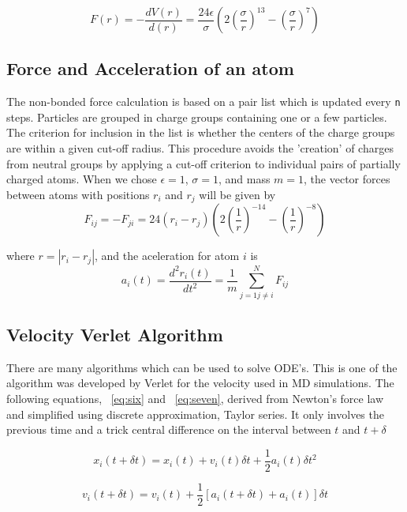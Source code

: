 \documentclass[]{article}
\begin{document}
\begin{equation}
\label{eq:three}
F(r) = -  \frac{dV(r)}{d(r)} = \frac{24\epsilon}{\sigma}(2{(\frac{\sigma}{r})}^{13} - {(\frac{\sigma}{r})}^7)
\end{equation}

\subsection{\label{sec:level1.1} Force and Acceleration of an atom}
The non-bonded force calculation is based on a pair list which is updated every \texttt{n} steps. Particles are grouped in charge groups containing one or a few particles. The criterion for inclusion in the list is whether the centers of the charge groups are within a given cut-off radius. This procedure avoids the 'creation' of charges from neutral groups by applying a cut-off criterion to individual pairs of partially charged atoms.
When we chose $\epsilon = 1$, $\sigma = 1$, and mass $m=1$, the vector forces between atoms with positions $r_i$ and $r_j$ will be given by
\begin{equation}
\label{eq:four}
F_{ij} = - F_{ji} = 24(r_i-r_j)(2{(\frac{1}{r})}^{-14} - {(\frac{1}{r})}^{-8})
\end{equation}

where $r=|r_i-r_j|$, and the aceleration for atom $i$ is
\begin{equation}
\label{eq:five}
a_i(t) = \frac{d^2r_i(t)}{dt^2} = \frac{1}{m}\sum_{j=1 j\neq i}^N{F_{ij}}
\end{equation}

\subsection{\label{sec:level1.2} Velocity Verlet Algorithm}
There are many algorithms which can be used to solve ODE’s. This is one of the algorithm was developed by Verlet for the velocity used in MD simulations. The following equations, ~\ref{eq:six} and ~\ref{eq:seven}, derived from Newton's force law and simplified using discrete approximation, Taylor series. It only involves the previous time and a trick central difference on the interval between $t$ and $t+\delta$

\begin{equation}
\label{eq:six}
x_i(t+\delta t) = x_i(t) +v_i(t)\delta t+ \frac{1}{2}a_i(t)\delta t^2
\end{equation}

\begin{equation}
\label{eq:seven}
v_i(t+\delta t) = v_i(t) + \frac{1}{2}[a_i(t+\delta t)+a_i(t)]\delta t
\end{equation}
\end{document}
